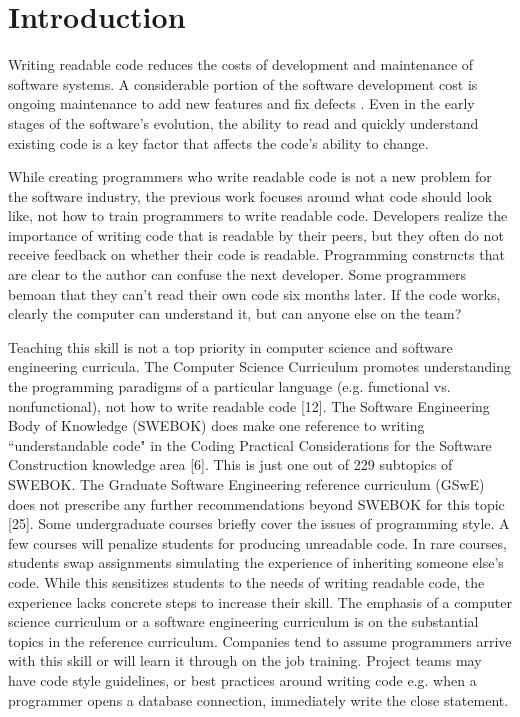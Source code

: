 \documentclass[conference]{IEEEtran}
\begin{document}
\section{Introduction}
Writing readable code reduces the costs of development and maintenance of software systems. A considerable portion of the software development cost is ongoing maintenance to add new features and fix defects \cite{BrooksMythicalManMonth}. Even in the early stages of the software’s evolution, the ability to read and quickly understand existing code is a key factor that affects the code’s ability to change.

While creating programmers who write readable code is not a new problem for the software industry, the previous work focuses around what code should look like, not how to train programmers to write readable code. Developers realize the importance of writing code that is readable by their peers, but they often do not receive feedback on whether their code is readable. Programming constructs that are clear to the author can confuse the next developer. Some programmers bemoan that they can’t read their own code six months later. If the code works, clearly the computer can understand it, but can anyone else on the team?

Teaching this skill is not a top priority in computer science and software engineering curricula. The Computer Science Curriculum promotes understanding the programming paradigms of a particular language (e.g. functional vs. nonfunctional), not how to write readable code [12]. The Software Engineering Body of Knowledge (SWEBOK) does make one reference to writing ``understandable code" in the Coding Practical Considerations for the Software Construction knowledge area [6]. This is just one out of 229 subtopics of SWEBOK. The Graduate Software Engineering reference curriculum (GSwE) does not prescribe any further recommendations beyond SWEBOK for this topic [25]. Some undergraduate courses briefly cover the issues of programming style. A few courses will penalize students for producing unreadable code. In rare courses, students swap assignments simulating the experience of inheriting someone else’s code. While this sensitizes students to the needs of writing readable code, the experience lacks concrete steps to increase their skill. The emphasis of a computer science curriculum or a software engineering curriculum is on the substantial topics in the reference curriculum.
Companies tend to assume programmers arrive with this skill or will learn it through on the job training. Project teams may have code style guidelines, or best practices around writing code e.g. when a programmer opens a database connection, immediately write the close statement.
\end{document}
